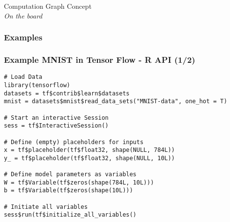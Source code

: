 \documentclass[9pt]{beamer}
\begin{document}
\begin{frame}{}
  \centering \Large
  Computation Graph Concept\\
  \emph{On the board}
\end{frame}
\subsubsection{Examples}
\begin{frame}[fragile]
\frametitle{Example MNIST in Tensor Flow - R API (1/2)}
\begin{lstlisting}[frame=single] 
# Load Data
library(tensorflow) 
datasets = tf$contrib$learn$datasets
mnist = datasets$mnist$read_data_sets("MNIST-data", one_hot = T)

# Start an interactive Session
sess = tf$InteractiveSession()

# Define (empty) placeholders for inputs
x = tf$placeholder(tf$float32, shape(NULL, 784L))
y_ = tf$placeholder(tf$float32, shape(NULL, 10L))

# Define model parameters as variables
W = tf$Variable(tf$zeros(shape(784L, 10L)))
b = tf$Variable(tf$zeros(shape(10L)))

# Initiate all variables 
sess$run(tf$initialize_all_variables()
\end{lstlisting}
\end{frame}
\end{document}
